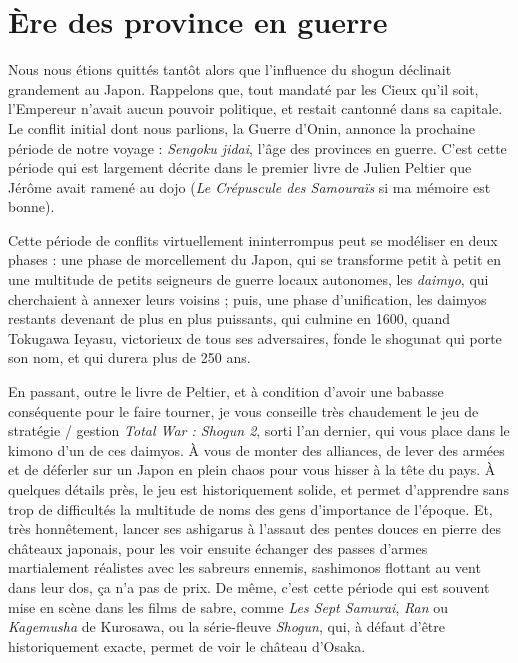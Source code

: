 \chapter{Ère des province en guerre}


Nous nous étions quittés tantôt alors que l'influence du shogun déclinait
grandement au Japon.  Rappelons que, tout mandaté par les Cieux qu'il soit,
l'Empereur n'avait aucun pouvoir politique, et restait cantonné dans sa
capitale. Le conflit initial dont nous parlions, la Guerre d'Onin, annonce la
prochaine période de notre voyage : \emph{Sengoku jidai}, l'âge des provinces
en guerre. C'est cette période qui est largement décrite dans le premier livre
de Julien Peltier que Jérôme avait ramené au dojo (\emph{Le Crépuscule des
Samouraïs} si ma mémoire est bonne).

Cette période de conflits virtuellement ininterrompus peut se modéliser en deux
phases : une phase de morcellement du Japon, qui se transforme petit à petit en
une multitude de petits seigneurs de guerre locaux autonomes, les
\emph{daimyo}, qui cherchaient à annexer leurs voisins ; puis, une phase
d'unification, les daimyos restants devenant de plus en plus puissants, qui
culmine en 1600, quand Tokugawa Ieyasu, victorieux de tous ses adversaires,
fonde le shogunat qui porte son nom, et qui durera plus de 250 ans.

En passant, outre le livre de Peltier, et à condition d'avoir une babasse
conséquente pour le faire tourner, je vous conseille très chaudement le jeu de
stratégie / gestion \emph{Total War : Shogun 2}, sorti l'an dernier, qui vous
place dans le kimono d'un de ces daimyos. À vous de monter des alliances, de
lever des armées et de déferler sur un Japon en plein chaos pour vous hisser à
la tête du pays. À quelques détails près, le jeu est historiquement solide, et
permet d'apprendre sans trop de difficultés la multitude de noms des gens
d'importance de l'époque. Et, très honnêtement, lancer ses ashigarus à l'assaut
des pentes douces en pierre des châteaux japonais, pour les voir ensuite
échanger des passes d'armes martialement réalistes avec les sabreurs ennemis,
sashimonos flottant au vent dans leur dos, ça n'a pas de prix. De même, c'est
cette période qui est souvent mise en scène dans les films de sabre, comme
\emph{Les Sept Samurai}, \emph{Ran} ou \emph{Kagemusha} de Kurosawa, ou la
série-fleuve \emph{Shogun}, qui, à défaut d'être historiquement exacte, permet
de voir le château d'Osaka.

